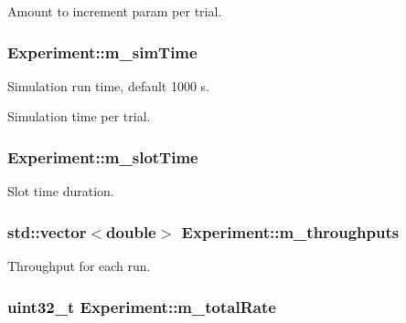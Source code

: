 Amount to increment param per trial. 

\subsubsection[{\texorpdfstring{m\+\_\+sim\+Time}{m_simTime}}]{ Experiment\+::m\+\_\+sim\+Time}\hypertarget{classExperiment_a3440bfac76174e478b35aa810d17543c}{}\label{classExperiment_a3440bfac76174e478b35aa810d17543c}


Simulation run time, default 1000 s. 

Simulation time per trial. 
\subsubsection[{\texorpdfstring{m\+\_\+slot\+Time}{m_slotTime}}]{ Experiment\+::m\+\_\+slot\+Time}\hypertarget{classExperiment_a72df8f8bffaba83db6821d0cf5b593fb}{}\label{classExperiment_a72df8f8bffaba83db6821d0cf5b593fb}


Slot time duration. 

\subsubsection[{\texorpdfstring{m\+\_\+throughputs}{m_throughputs}}]{\setlength{\rightskip}{0pt plus 5cm}std\+::vector$<$double$>$ Experiment\+::m\+\_\+throughputs}\hypertarget{classExperiment_aaacf74af811020eeb7fb850b2277c054}{}\label{classExperiment_aaacf74af811020eeb7fb850b2277c054}


Throughput for each run. 

\subsubsection[{\texorpdfstring{m\+\_\+total\+Rate}{m_totalRate}}]{\setlength{\rightskip}{0pt plus 5cm}uint32\+\_\+t Experiment\+::m\+\_\+total\+Rate}\hypertarget{classExperiment_a5259793f074543984f6bcf15b8add220}{}\label{classExperiment_a5259793f074543984f6bcf15b8add220}


